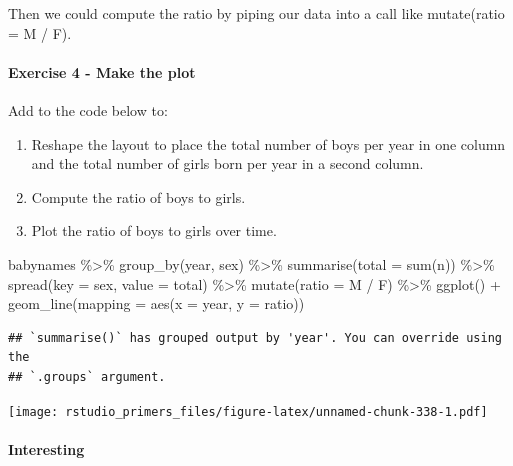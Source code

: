 \documentclass[
]{article}
\newenvironment{Shaded}{\begin{snugshade}}{\end{snugshade}}
\newcommand{\AttributeTok}[1]{\textcolor[rgb]{0.77,0.63,0.00}{#1}}
\newcommand{\FunctionTok}[1]{\textcolor[rgb]{0.00,0.00,0.00}{#1}}
\newcommand{\NormalTok}[1]{#1}
\newcommand{\SpecialCharTok}[1]{\textcolor[rgb]{0.00,0.00,0.00}{#1}}
\providecommand{\tightlist}{%
  \setlength{\itemsep}{0pt}\setlength{\parskip}{0pt}}
\begin{document}
Then we could compute the ratio by piping our data into a call like
mutate(ratio = M / F).

\hypertarget{exercise-4---make-the-plot}{%
\paragraph{Exercise 4 - Make the
plot}\label{exercise-4---make-the-plot}}

Add to the code below to:

\begin{enumerate}
\def\labelenumi{\arabic{enumi}.}
\tightlist
\item
  Reshape the layout to place the total number of boys per year in one
  column and the total number of girls born per year in a second column.
\item
  Compute the ratio of boys to girls.
\item
  Plot the ratio of boys to girls over time.
\end{enumerate}

\begin{Shaded}
\begin{Highlighting}[]
\NormalTok{babynames }\SpecialCharTok{\%\textgreater{}\%}
  \FunctionTok{group\_by}\NormalTok{(year, sex) }\SpecialCharTok{\%\textgreater{}\%} 
  \FunctionTok{summarise}\NormalTok{(}\AttributeTok{total =} \FunctionTok{sum}\NormalTok{(n)) }\SpecialCharTok{\%\textgreater{}\%}
  \FunctionTok{spread}\NormalTok{(}\AttributeTok{key =}\NormalTok{ sex, }\AttributeTok{value =}\NormalTok{ total) }\SpecialCharTok{\%\textgreater{}\%}
  \FunctionTok{mutate}\NormalTok{(}\AttributeTok{ratio =}\NormalTok{ M }\SpecialCharTok{/}\NormalTok{ F) }\SpecialCharTok{\%\textgreater{}\%}
  \FunctionTok{ggplot}\NormalTok{() }\SpecialCharTok{+} 
    \FunctionTok{geom\_line}\NormalTok{(}\AttributeTok{mapping =} \FunctionTok{aes}\NormalTok{(}\AttributeTok{x =}\NormalTok{ year, }\AttributeTok{y =}\NormalTok{ ratio))}
\end{Highlighting}
\end{Shaded}

\begin{verbatim}
## `summarise()` has grouped output by 'year'. You can override using the
## `.groups` argument.
\end{verbatim}

\texttt{[image: rstudio\_primers\_files/figure-latex/unnamed-chunk-338-1.pdf]}

\hypertarget{interesting}{%
\paragraph{Interesting}\label{interesting}}
\end{document}
